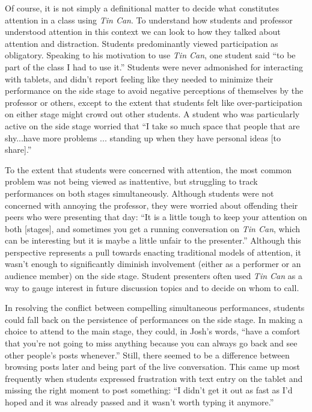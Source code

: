 
Of course, it is not simply a definitional matter to decide what constitutes attention in a class using \emph{Tin Can}. To understand how students and professor understood attention in this context we can look to how they talked about attention and distraction. Students predominantly viewed participation as obligatory. Speaking to his motivation to use \emph{Tin Can}, one student said ``to be part of the class I had to use it.'' Students were never admonished for interacting with tablets, and didn't report feeling like they needed to minimize their performance on the side stage to avoid negative perceptions of themselves by the professor or others, except to the extent that students felt like over-participation on either stage might crowd out other students. A student who was particularly active on the side stage worried that ``I take so much space that people that are shy...have more problems ... standing up when they have personal ideas [to share].''


To the extent that students were concerned with attention, the most common problem was not being viewed as inattentive, but struggling to track performances on both stages simultaneously. Although students were not concerned with annoying the professor, they were worried about offending their peers who were presenting that day: ``It is a little tough to keep your attention on both [stages], and sometimes you get a running conversation on \emph{Tin Can}, which can be interesting but it is maybe a little unfair to the presenter.'' Although this perspective represents a pull towards enacting traditional models of attention, it wasn't enough to significantly diminish involvement (either as a performer or an audience member) on the side stage. Student presenters often used \emph{Tin Can} as a way to gauge interest in future discussion topics and to decide on whom to call.

In resolving the conflict between compelling simultaneous performances, students could fall back on the persistence of performances on the side stage. In making a choice to attend to the main stage, they could, in Josh's words, ``have a comfort that you're not going to miss anything because you can always go back and see other people's posts whenever.'' Still, there seemed to be a difference between browsing posts later and being part of the live conversation. This came up most frequently when students expressed frustration with text entry on the tablet and missing the right moment to post something: ``I didn't get it out as fast as I'd hoped and it was already passed and it wasn't worth typing it anymore.'' 

